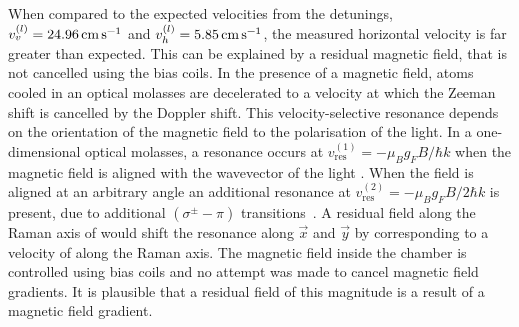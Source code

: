 \par\noindent
When compared to the expected velocities from the detunings,
\(v^{(l)}_v = \sivalue{24.96}{\centi\metre\per\second}\) and
\(v^{(l)}_h = \sivalue{5.85}{\centi\metre\per\second}\), the measured
horizontal velocity is far greater than expected. This can be
explained by a residual magnetic field, that is not cancelled using
the bias coils. In the presence of a magnetic field, atoms cooled in
an optical molasses are decelerated to a velocity at which the Zeeman
shift is cancelled by the Doppler shift. This velocity-selective
resonance depends on the
orientation of the magnetic field to the polarisation of the light. In
a one-dimensional optical molasses, a resonance occurs at
\(v_\text{res}^{(1)} = - \mu_B g_F B/\hbar k\) when the magnetic field
is aligned with the wavevector of the light \cite{VanderStraten1993}.
When the field is aligned at an arbitrary angle an additional
resonance at \(v_\text{res}^{(2)} = - \mu_B g_F B/2\hbar k\) is
present, due to additional \(\left(\sigma^{\pm}-\pi\right)\)
transitions~\cite{Chang2002,Walhout1992}. A residual field along the Raman axis of
 would shift the resonance along \(\vec{x}\)
and \(\vec{y}\) by 
corresponding to a velocity of 
along the Raman axis. The magnetic field inside the chamber is
controlled using bias coils and no attempt was made to cancel magnetic
field gradients. It is plausible that a residual field of this
magnitude is a result of a magnetic field gradient.

